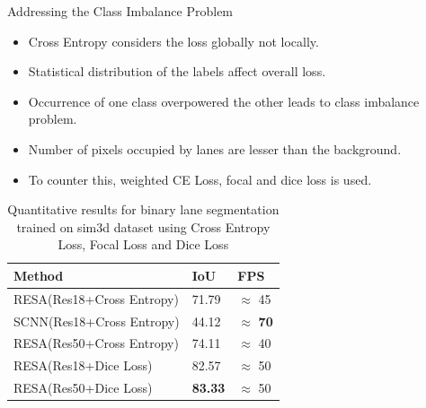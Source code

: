 \documentclass[aspectratio=169]{beamer}
\begin{document}
\begin{frame}{Addressing the Class Imbalance Problem}
\begin{itemize}
    \item Cross Entropy considers the loss globally not locally. 
    \item Statistical distribution of the labels affect overall loss. 
    \item Occurrence of one class overpowered the other leads to class imbalance problem.
    \item Number of pixels occupied by lanes are lesser than the background. 
    \item To counter this, weighted CE Loss, focal and dice loss is used. 
\end{itemize}

    \begin{table}[h!]
    \caption{Quantitative results for binary lane segmentation trained on sim3d dataset using Cross Entropy Loss, Focal Loss and Dice Loss}
    \centering
    \begin{tabular}{|l|l|l|}
    \hline
        \textbf{Method} & \textbf{IoU} & \textbf{FPS} \\ \hline
        RESA(Res18+Cross Entropy)  & 71.79 & $\approx$ 45 \\ \hline
        SCNN(Res18+Cross Entropy) & 44.12 & $\approx$ \textbf{70}  \\ \hline
        RESA(Res50+Cross Entropy)  & 74.11 & $\approx$ 40  \\ \hline

        RESA(Res18+Dice Loss) & 82.57 & $\approx$ 50 \\\hline
        RESA(Res50+Dice Loss) & \textbf{83.33} & $\approx$ 50 \\\hline
    \end{tabular}
\end{table}
\end{frame}
\end{document}
